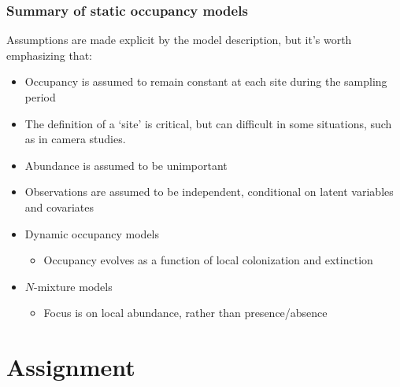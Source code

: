 \documentclass[color=usenames,dvipsnames]{beamer}\usepackage[]{graphicx}\usepackage[]{color}
\begin{document}
\begin{frame}
  \frametitle{Summary of static occupancy models}
  \small
  Assumptions are made explicit by the model description, but it's worth emphasizing that: 
  \begin{itemize}[<+->]
    \item<2-> Occupancy is assumed to remain constant at each site during the sampling period
    \item<3-> The definition of a `site' is critical, but can difficult in
      some situations, such as in camera studies.
    \item<4-> Abundance is assumed to be unimportant
    \item<5-> Observations are assumed to be independent, conditional
      on latent variables and covariates
  \end{itemize}
  \vfill
  \begin{itemize}
    \item<7-> Dynamic occupancy models
    \begin{itemize}
      \item Occupancy evolves as a function of local colonization
        and extinction
    \end{itemize}
    \item<8-> $N$-mixture models
    \begin{itemize}
      \item Focus is on local abundance, rather than presence/absence
    \end{itemize}
  \end{itemize}
  \vfill
\end{frame}



\section{Assignment}
\end{document}
